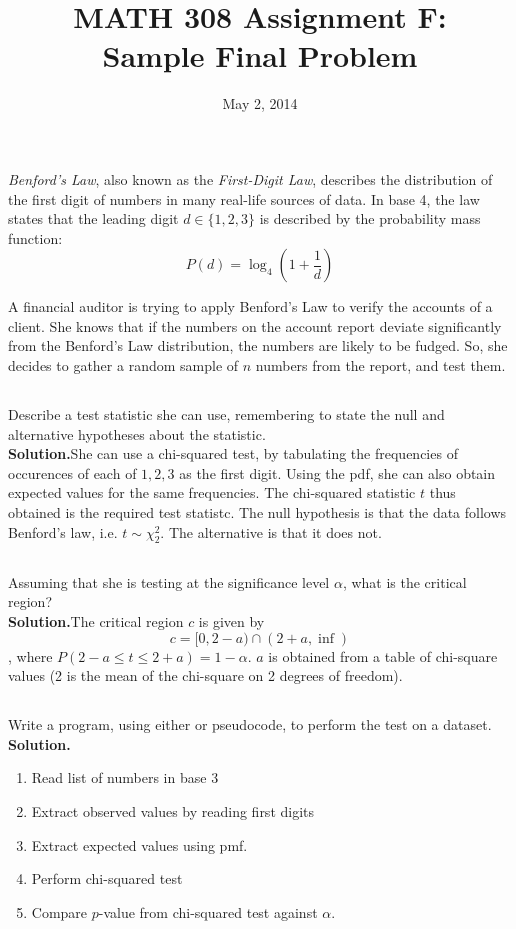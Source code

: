 \documentclass[twocolumn]{article}
\title{MATH 308 Assignment F:\\Sample Final Problem}
\date{May 2, 2014}
\begin{document}
\maketitle

\newcommand{\sol}{\textbf{Solution.}}

\emph{Benford's Law}, also known as the \emph{First-Digit Law}, describes the distribution of the first digit of numbers in many real-life sources of data. In base 4, the law states that the leading digit $d \in \{1,2,3\}$ is described by the probability mass function:\[
P(d)=\log_{4}\left(1+\frac{1}{d}\right)
\]

A financial auditor is trying to apply Benford's Law to verify the accounts of a client. She knows that if the numbers on the account report deviate significantly from the Benford's Law distribution, the numbers are likely to be fudged. So, she decides to gather a random sample of $n$ numbers from the report, and test them.

\subsection{}
Describe a test statistic she can use, remembering to state the null and alternative hypotheses about the statistic.\\
\sol She can use a chi-squared test, by tabulating the frequencies of occurences of each of ${1,2,3}$ as the first digit. Using the pdf, she can also obtain expected values for the same frequencies. The chi-squared statistic $t$ thus obtained is the required test statistc. The null hypothesis is that the data follows Benford's law, i.e. $t\sim\chi^2_2$. The alternative is that it does not.
\newpage
\subsection{}
Assuming that she is testing at the significance level $\alpha$, what is the critical region?\\
\sol The critical region $c$ is given by \[c=[0,2-a)\cap (2+a,\inf) \], where $P(2-a\le t\le 2+a)=1-\alpha$. $a$ is obtained from a table of chi-square values (2 is the mean of the chi-square on 2 degrees of freedom).
\subsection{}
Write a program, using either  or pseudocode, to perform the test on a dataset.\\
\sol \begin{enumerate}
\item Read list of numbers in base 3
\item Extract observed values by reading first digits
\item Extract expected values using pmf.
\item Perform chi-squared test
\item Compare $p$-value from chi-squared test against $\alpha$.
\end{enumerate}
\end{document}
